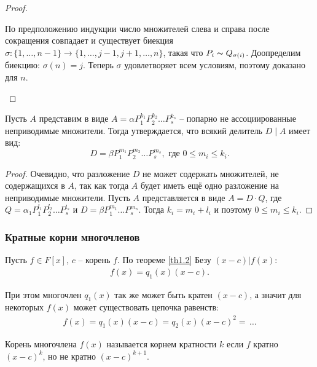 \begin{proof}
\begin{enumerate}
\begin{enumerate}
            По предположению индукции число множителей слева и справа после сокращения совпадает и 
            существует биекция $\sigma: \{ 1, \dots , n - 1\} \longrightarrow \{ 1, \dots , j - 1, j + 1, \dots , n \}$, 
            такая что $P_i \thicksim Q_{\sigma(i)}$. Доопределим биекцию: 
            $\sigma(n) = j$. Теперь $\sigma$ удовлетворяет всем условиям, 
            поэтому доказано для $n$.
        \end{enumerate}
    \end{enumerate}
\end{proof}

\begin{corollary}
    Пусть $A$ представим в виде $A = \alpha P_1^{k_1}P_2^{k_2} \dots P_s^{k_s}$ -- попарно не 
    ассоциированные неприводимые множители. Тогда утверждается, что всякий делитель $D\mid A$ 
    имеет вид: $$D = \beta P_1^{m_1}P_2^{m_2} \dots P_s^{m_s}, \text{ где } 0 \leq m_i \leq k_i.$$
\end{corollary}

\begin{proof}
    Очевидно, что разложение $D$ не может содержать множителей, не содержащихся в $A$, так как тогда $A$ будет иметь
    ещё одно разложение на неприводимые множители.
    Пусть $A$ представляется в виде $A = D \cdot Q$, где
    $Q = \alpha_1 P_1^{l_1}P_2^{l_2} \dots P_s^{l_s}$ и
    $D = \beta P_1^{m_1} \dots P_s^{m_s}$. Тогда $k_i = m_i + l_i$ и поэтому $0 \leq m_i \leq k_i$.
\end{proof}

\subsubsection{Кратные корни многочленов}

Пусть $f \in F[x]$, $c$ -- корень $f$. По теореме \ref{th1.2} Безу $(x-c) \vert f(x)$:
\begin{gather*}
    f(x) = q_1(x)(x - c).
\end{gather*}

При этом многочлен $q_1(x)$ так же может быть кратен $(x-c)$, а значит для некоторых $f(x)$ может 
существовать цепочка равенств:
\begin{gather*}
    f(x) = q_1(x)(x - c) = q_2(x)(x-c)^2 = \, \dots
\end{gather*}

\begin{definition}
    Корень многочлена $f(x)$ называется корнем кратности $k$ если $f$ кратно $(x-c)^k$, но не кратно $(x-c)^{k+1}$.
\end{definition}


